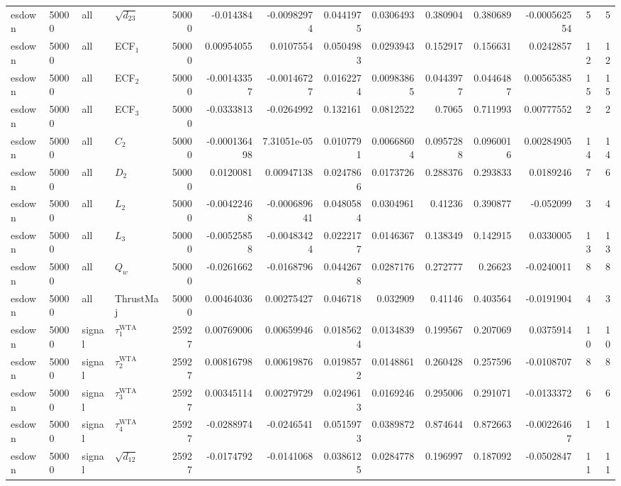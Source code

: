 \begin{landscape}
\begin{longtable}{llll r rrrr rr r rr}
esdown & 50000 & all & $\sqrt{d_{23}}$ & 50000 & -0.014384 & -0.00982974 & 0.0441975 & 0.0306493 & 0.380904 & 0.380689 & -0.000562554 & 5 & 5 \\
esdown & 50000 & all & ECF$_1$ & 50000 & 0.00954055 & 0.0107554 & 0.0504983 & 0.0293943 & 0.152917 & 0.156631 & 0.0242857 & 12 & 12 \\
esdown & 50000 & all & ECF$_2$ & 50000 & -0.00143357 & -0.00146727 & 0.0162274 & 0.00983865 & 0.0443977 & 0.0446487 & 0.00565385 & 15 & 15 \\
esdown & 50000 & all & ECF$_3$ & 50000 & -0.0333813 & -0.0264992 & 0.132161 & 0.0812522 & 0.7065 & 0.711993 & 0.00777552 & 2 & 2 \\
esdown & 50000 & all & $C_2$ & 50000 & -0.000136498 & 7.31051e-05 & 0.0107791 & 0.00668604 & 0.0957288 & 0.0960016 & 0.00284905 & 14 & 14 \\
esdown & 50000 & all & $D_2$ & 50000 & 0.0120081 & 0.00947138 & 0.0247866 & 0.0173726 & 0.288376 & 0.293833 & 0.0189246 & 7 & 6 \\
esdown & 50000 & all & $L_2$ & 50000 & -0.00422468 & -0.000689641 & 0.0480584 & 0.0304961 & 0.41236 & 0.390877 & -0.052099 & 3 & 4 \\
esdown & 50000 & all & $L_3$ & 50000 & -0.00525858 & -0.00483424 & 0.0222177 & 0.0146367 & 0.138349 & 0.142915 & 0.0330005 & 13 & 13 \\
esdown & 50000 & all & $Q_w$ & 50000 & -0.0261662 & -0.0168796 & 0.0442678 & 0.0287176 & 0.272777 & 0.26623 & -0.0240011 & 8 & 8 \\
esdown & 50000 & all & ThrustMaj & 50000 & 0.00464036 & 0.00275427 & 0.046718 & 0.032909 & 0.41146 & 0.403564 & -0.0191904 & 4 & 3 \\
esdown & 50000 & signal & $\tau_1^{\mathrm{WTA}}$ & 25927 & 0.00769006 & 0.00659946 & 0.0185624 & 0.0134839 & 0.199567 & 0.207069 & 0.0375914 & 10 & 10 \\
esdown & 50000 & signal & $\tau_2^{\mathrm{WTA}}$ & 25927 & 0.00816798 & 0.00619876 & 0.0198572 & 0.0148861 & 0.260428 & 0.257596 & -0.0108707 & 8 & 8 \\
esdown & 50000 & signal & $\tau_3^{\mathrm{WTA}}$ & 25927 & 0.00345114 & 0.00279729 & 0.0249613 & 0.0169246 & 0.295006 & 0.291071 & -0.0133372 & 6 & 6 \\
esdown & 50000 & signal & $\tau_4^{\mathrm{WTA}}$ & 25927 & -0.0288974 & -0.0246541 & 0.0515973 & 0.0389872 & 0.874644 & 0.872663 & -0.00226467 & 1 & 1 \\
esdown & 50000 & signal & $\sqrt{d_{12}}$ & 25927 & -0.0174792 & -0.0141068 & 0.0386125 & 0.0284778 & 0.196997 & 0.187092 & -0.0502847 & 11 & 11 \\

\end{longtable}
\end{landscape}
